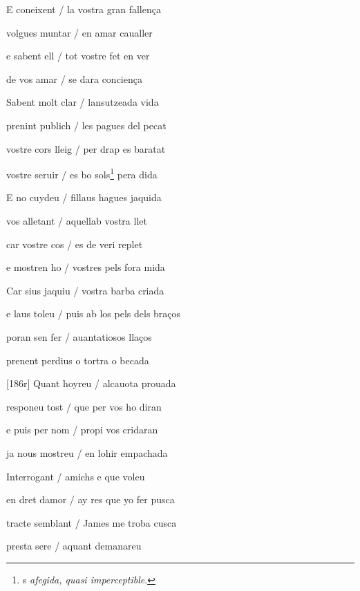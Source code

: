 \documentclass[12pt]{article}
\begin{document}
\begin{estrofa}

 E coneixent / la vostra gran fallen\c{c}a

 volgues muntar / en amar caualler

 e sabent ell / tot vostre fet en ver

 de vos amar / se dara concien\c{c}a

 Sabent molt clar / lansutzeada vida

 prenint publich / les pagues del pecat

 vostre cors lleig / per drap es baratat

 vostre seruir / es bo sols\footnote{s \textit{afegida, quasi imperceptible}.}
pera dida

\end{estrofa}



\begin{estrofa}

 E no cuydeu / fillaus hagues jaquida

 vos alletant / aquellab vostra llet

 car vostre cos / es de veri replet

 e mostren ho / vostres pels fora mida

 Car sius jaquiu / vostra barba criada

 e laus toleu / puis ab los pels dels bra\c{c}os

 poran sen fer / auantatiosos lla\c{c}os

 prenent perdius o tortra o becada

\end{estrofa}



\begin{estrofa}

 [186r] Quant hoyreu / alcauota prouada

 responeu tost / que per vos ho diran

 e puis per nom / propi vos cridaran

 ja nous mostreu / en lohir empachada

 Interrogant / amichs e que voleu

 en dret damor / ay res que yo fer pusca

 tracte semblant / James me troba cusca

 presta sere / aquant demanareu

\end{estrofa}
\end{document}

